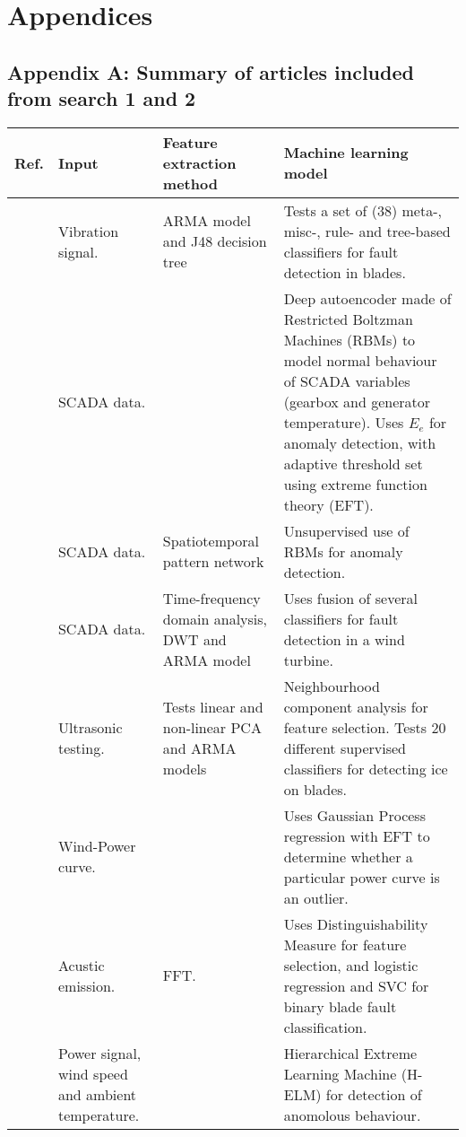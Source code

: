 \chapter{Appendices}

\section{Appendix A: Summary of articles included from search 1 and 2}

\begin{longtable}{p{}p{}p{}p{}}
    \hline
    Ref. & Input & Feature extraction method & Machine learning model \\
    \hline \hline
    \cite{ml_cm_wt_blade_ARMA_2018} & Vibration signal. & ARMA model and J48 decision tree & Tests a set of (38) meta-, misc-, rule- and tree-based classifiers for fault detection in blades. \\  \hline
    \cite{AD_and_fault_analysis_wt_DAE} & SCADA data. & & Deep autoencoder made of Restricted Boltzman Machines (RBMs) to model normal behaviour of SCADA variables (gearbox and generator temperature). Uses $E_e$ for anomaly detection, with adaptive threshold set using extreme function theory (EFT). \\ \hline
    \cite{unsup_graphical_modeling_wt_cm} & SCADA data. & Spatiotemporal pattern network & Unsupervised use of RBMs for anomaly detection. \\ \hline
    \cite{fault_detection_and_isolation_using_classifier_fusion} & SCADA data. & Time-frequency domain analysis, DWT and ARMA model & Uses fusion of several classifiers for fault detection in a wind turbine.  \\ \hline
    \cite{lin_and_non_lin_feat_for_ice_detection_on_blades} & Ultrasonic testing. & Tests linear and non-linear PCA and ARMA models & Neighbourhood component analysis for feature selection. Tests 20 different supervised classifiers for detecting ice on blades. \\ \hline
    \cite{perf_mon_of_wt_using_extreme_func_theory} & Wind-Power curve. &  & Uses Gaussian Process regression with EFT to determine whether a particular power curve is an outlier.\\ \hline
    \cite{blade_damage_detection_sup_ml_alg} & Acustic emission. & FFT. & Uses Distinguishability Measure for feature selection, and logistic regression and SVC for binary blade fault classification. \\ \hline
    \cite{wt_cm_using_cloud_computing_and_HELM} & Power signal, wind speed and ambient temperature. & & Hierarchical Extreme Learning Machine (H-ELM) for detection of anomolous behaviour. \\ \hline

\end{longtable}
